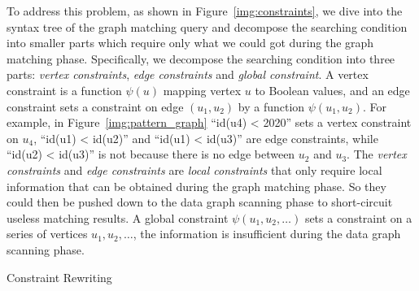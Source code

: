 To address this problem, as shown in Figure~\ref{img:constraints},
we dive into the syntax tree of the graph matching query and decompose the searching condition into smaller parts which require only what we could got during the graph matching phase.
Specifically, we decompose the searching condition into three parts: \emph{vertex constraints}, \emph{edge constraints} and \emph{global constraint}.
A vertex constraint is a function $\psi(u)$ mapping vertex $u$ to Boolean values,
and an edge constraint sets a constraint on edge $(u_1, u_2)$ by a function $\psi(u_1, u_2)$.
For example, in Figure~\ref{img:pattern_graph} ``{id(u4) < 2020}'' sets a vertex constraint on $u_4$,
``{id(u1) < id(u2)}'' and ``{id(u1) < id(u3)}'' are edge constraints,
while ``{id(u2) < id(u3)}'' is not because there is no edge between $u_2$ and $u_3$.
The \emph{vertex constraints} and \emph{edge constraints} are \emph{local constraints} that only require local information that can be obtained during the graph matching phase.
So they could then be pushed down to the data graph scanning phase to short-circuit useless matching results.
A global constraint $\psi(u_1, u_2, \dots)$ sets a constraint on a series of vertices $u_1, u_2, \dots$,
the information is insufficient during the data graph scanning phase.

\begin{algorithm}[ht]
  \caption{Constraint Rewriting}\label{alg:rewrite}
\end{algorithm}

